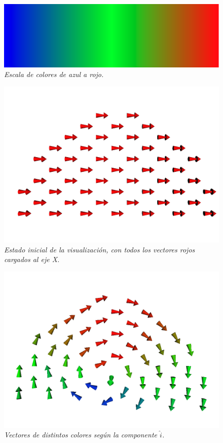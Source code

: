 \begin{figure}[H]
  \centering
  \includegraphics[scale=.4]{images/atomCanvas-colorScale}
  \caption{\em Escala de colores de azul a rojo.}
\end{figure}

\begin{figure}[H]
  \centering
  \includegraphics[scale=.3]{images/atomCanvas-vectores-inicial}
  \caption{\em Estado inicial de la visualización, con todos los vectores rojos cargados al eje X.}
\end{figure}

\begin{figure}[H]
  \centering
  \includegraphics[scale=.3]{images/atomCanvas-vectores-colores}
  \caption{\em Vectores de distintos colores según la componente $\hat{i}$.}
\end{figure}

